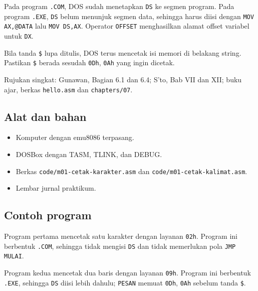 Pada program \texttt{.COM}, DOS sudah menetapkan \texttt{DS} ke
segmen program. Pada program \texttt{.EXE}, \texttt{DS} belum
menunjuk segmen data, sehingga harus diisi dengan
\texttt{MOV AX,@DATA} lalu \texttt{MOV DS,AX}. Operator
\texttt{OFFSET} menghasilkan alamat offset variabel untuk \texttt{DX}.

Bila tanda \texttt{\$} lupa ditulis, DOS terus mencetak isi memori di
belakang string. Pastikan \texttt{\$} berada sesudah \texttt{0Dh},
\texttt{0Ah} yang ingin dicetak.

\begin{rujukan}
Rujukan singkat: Gunawan, Bagian 6.1 dan 6.4; S'to, Bab VII dan XII;
buku ajar, berkas \texttt{hello.asm} dan \texttt{chapters/07}.
\end{rujukan}

\subsection{Alat dan bahan}

\begin{itemize}
    \item Komputer dengan emu8086 terpasang.
    \item DOSBox dengan TASM, TLINK, dan DEBUG.
    \item Berkas \texttt{code/m01-cetak-karakter.asm} dan
          \texttt{code/m01-cetak-kalimat.asm}.
    \item Lembar jurnal praktikum.
\end{itemize}

\subsection{Contoh program}

Program pertama mencetak satu karakter dengan layanan \texttt{02h}.
Program ini berbentuk \texttt{.COM}, sehingga tidak mengisi
\texttt{DS} dan tidak memerlukan pola \texttt{JMP MULAI}.



Program kedua mencetak dua baris dengan layanan \texttt{09h}.
Program ini berbentuk \texttt{.EXE}, sehingga \texttt{DS} diisi lebih
dahulu; \texttt{PESAN} memuat \texttt{0Dh}, \texttt{0Ah} sebelum
tanda \texttt{\$}.



